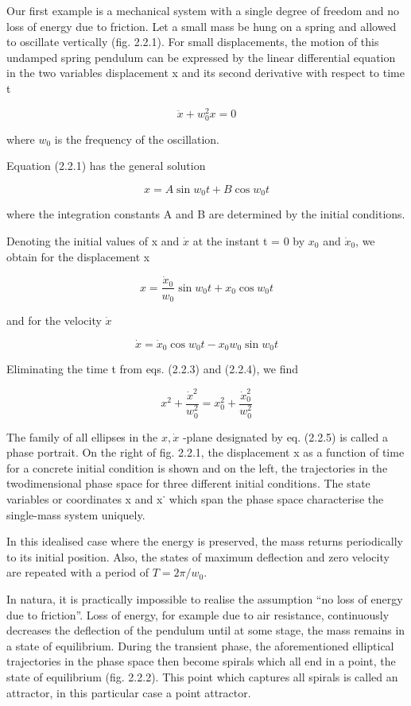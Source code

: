 \documentclass[12pt]{article}
\begin{document}
\hfill

Our first example is a mechanical system with a single degree of freedom and no
loss of energy due to friction. Let a small mass be hung on a spring and allowed to
oscillate vertically (fig. 2.2.1). For small displacements, the motion of this undamped
spring pendulum can be expressed by the linear differential equation in the two
variables displacement x and its second derivative with respect to time t

\[
\ddot{x} + w^2_0x = 0
\]


where $w_0$ is the frequency of the oscillation.

Equation (2.2.1) has the general solution

\[
x = A \sin w_0 t + B \cos w_0t
\]

where the integration constants A and B are determined by the initial conditions.

Denoting the initial values of x and $\dot{x}$ at the instant t = 0 by $x_0$ and $\dot{x}_0$, we obtain
for the displacement x

\[
x = \frac{\dot{x}_0}{w_0} \sin w_0t + x_0 \cos w_0t
\]

and for the velocity $\dot{x}$

\[
\dot{x} = \dot{x}_0 \cos w_0 t - x_0 w_0 \sin w_0 t
\]

Eliminating the time t from eqs. (2.2.3) and (2.2.4), we find

\[
x^2 + \frac{\dot{x}^2}{w_0^2} = x_0^2 + \frac{\dot{x}_0^2}{w_0^2}
\]

The family of all ellipses in the $x,  \dot{x}$ -plane designated by eq. (2.2.5) is called a phase
portrait. On the right of fig. 2.2.1, the displacement x as a function of time for
a concrete initial condition is shown and on the left, the trajectories in the twodimensional
phase space for three different initial conditions. The state variables
or coordinates x and x˙ which span the phase space characterise the single-mass
system uniquely.

\hfill

In this idealised case where the energy is preserved, the mass returns periodically
to its initial position. Also, the states of maximum deflection and zero velocity are
repeated with a period of $T = 2 \pi/w_0$.

\hfill

In natura, it is practically impossible to realise the assumption “no loss of energy
due to friction”. Loss of energy, for example due to air resistance, continuously
decreases the deflection of the pendulum until at some stage, the mass remains
in a state of equilibrium. During the transient phase, the aforementioned elliptical
trajectories in the phase space then become spirals which all end in a point, the
state of equilibrium (fig. 2.2.2). This point which captures all spirals is called an
attractor, in this particular case a point attractor.
\end{document}
